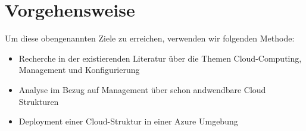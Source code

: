 \section{Vorgehensweise}

Um diese obengenannten Ziele zu erreichen, verwenden wir folgenden Methode:

\begin{itemize}
   \item Recherche in der existierenden Literatur über die Themen Cloud-Computing, Management und Konfigurierung
   \item Analyse im Bezug auf Management über schon andwendbare Cloud Strukturen
   \item Deployment einer Cloud-Struktur in einer Azure Umgebung
\end{itemize}








